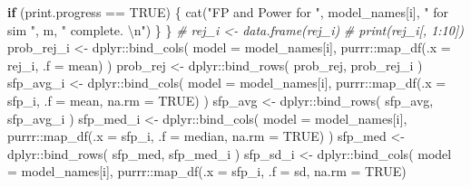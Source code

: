 \documentclass[
]{article}
\newenvironment{Shaded}{\begin{snugshade}}{\end{snugshade}}
\newcommand{\AttributeTok}[1]{\textcolor[rgb]{0.77,0.63,0.00}{#1}}
\newcommand{\CommentTok}[1]{\textcolor[rgb]{0.56,0.35,0.01}{\textit{#1}}}
\newcommand{\ConstantTok}[1]{\textcolor[rgb]{0.00,0.00,0.00}{#1}}
\newcommand{\ControlFlowTok}[1]{\textcolor[rgb]{0.13,0.29,0.53}{\textbf{#1}}}
\newcommand{\FunctionTok}[1]{\textcolor[rgb]{0.00,0.00,0.00}{#1}}
\newcommand{\NormalTok}[1]{#1}
\newcommand{\OtherTok}[1]{\textcolor[rgb]{0.56,0.35,0.01}{#1}}
\newcommand{\SpecialCharTok}[1]{\textcolor[rgb]{0.00,0.00,0.00}{#1}}
\newcommand{\StringTok}[1]{\textcolor[rgb]{0.31,0.60,0.02}{#1}}
\begin{document}
\begin{Shaded}
\begin{Highlighting}[]
      \ControlFlowTok{if}\NormalTok{ (print.progress }\SpecialCharTok{==} \ConstantTok{TRUE}\NormalTok{) \{}
        \FunctionTok{cat}\NormalTok{(}\StringTok{"FP and Power for "}\NormalTok{, model\_names[i], }\StringTok{" for sim "}\NormalTok{, m, }\StringTok{" complete. }\SpecialCharTok{\textbackslash{}n}\StringTok{"}\NormalTok{)}
\NormalTok{      \}}
\NormalTok{    \}}
    \CommentTok{\# rej\_i \textless{}{-} data.frame(rej\_i)}
    \CommentTok{\# print(rej\_i[, 1:10])}
\NormalTok{    prob\_rej\_i }\OtherTok{\textless{}{-}}\NormalTok{ dplyr}\SpecialCharTok{::}\FunctionTok{bind\_cols}\NormalTok{(}
      \AttributeTok{model =}\NormalTok{ model\_names[i],}
\NormalTok{      purrr}\SpecialCharTok{::}\FunctionTok{map\_df}\NormalTok{(}\AttributeTok{.x =}\NormalTok{ rej\_i, }\AttributeTok{.f =}\NormalTok{ mean)}
\NormalTok{    )}
\NormalTok{    prob\_rej }\OtherTok{\textless{}{-}}\NormalTok{ dplyr}\SpecialCharTok{::}\FunctionTok{bind\_rows}\NormalTok{(}
\NormalTok{      prob\_rej,}
\NormalTok{      prob\_rej\_i}
\NormalTok{    )}
\NormalTok{    sfp\_avg\_i }\OtherTok{\textless{}{-}}\NormalTok{ dplyr}\SpecialCharTok{::}\FunctionTok{bind\_cols}\NormalTok{(}
      \AttributeTok{model =}\NormalTok{ model\_names[i],}
\NormalTok{      purrr}\SpecialCharTok{::}\FunctionTok{map\_df}\NormalTok{(}\AttributeTok{.x =}\NormalTok{ sfp\_i, }\AttributeTok{.f =}\NormalTok{ mean, }\AttributeTok{na.rm =} \ConstantTok{TRUE}\NormalTok{)}
\NormalTok{    )}
\NormalTok{    sfp\_avg }\OtherTok{\textless{}{-}}\NormalTok{ dplyr}\SpecialCharTok{::}\FunctionTok{bind\_rows}\NormalTok{(}
\NormalTok{      sfp\_avg,}
\NormalTok{      sfp\_avg\_i}
\NormalTok{    )}
\NormalTok{    sfp\_med\_i }\OtherTok{\textless{}{-}}\NormalTok{ dplyr}\SpecialCharTok{::}\FunctionTok{bind\_cols}\NormalTok{(}
      \AttributeTok{model =}\NormalTok{ model\_names[i],}
\NormalTok{      purrr}\SpecialCharTok{::}\FunctionTok{map\_df}\NormalTok{(}\AttributeTok{.x =}\NormalTok{ sfp\_i, }\AttributeTok{.f =}\NormalTok{ median, }\AttributeTok{na.rm =} \ConstantTok{TRUE}\NormalTok{)}
\NormalTok{    )}
\NormalTok{    sfp\_med }\OtherTok{\textless{}{-}}\NormalTok{ dplyr}\SpecialCharTok{::}\FunctionTok{bind\_rows}\NormalTok{(}
\NormalTok{      sfp\_med,}
\NormalTok{      sfp\_med\_i}
\NormalTok{    )}
\NormalTok{    sfp\_sd\_i }\OtherTok{\textless{}{-}}\NormalTok{ dplyr}\SpecialCharTok{::}\FunctionTok{bind\_cols}\NormalTok{(}
      \AttributeTok{model =}\NormalTok{ model\_names[i],}
\NormalTok{      purrr}\SpecialCharTok{::}\FunctionTok{map\_df}\NormalTok{(}\AttributeTok{.x =}\NormalTok{ sfp\_i, }\AttributeTok{.f =}\NormalTok{ sd, }\AttributeTok{na.rm =} \ConstantTok{TRUE}\NormalTok{)}

\end{Highlighting}
\end{Shaded}
\end{document}
